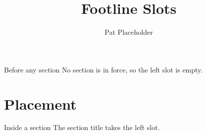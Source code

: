 \documentclass[aspectratio=169]{beamer}
\title{Footline Slots}
\author{Pat Placeholder}
\begin{document}
\maketitle

\begin{frame}{Before any section}
  No section is in force, so the left slot is empty.
\end{frame}

\section{Placement}

\begin{frame}{Inside a section}
  The section title takes the left slot.
\end{frame}
\end{document}
